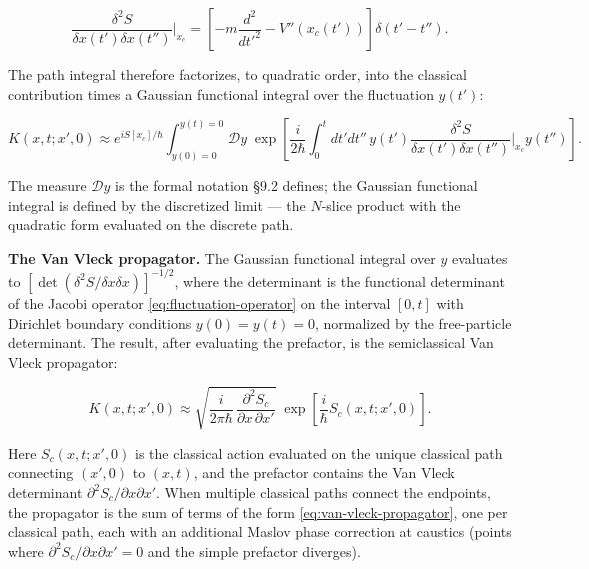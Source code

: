 \begin{linenomath}
\begin{equation}
\frac{\delta^2 S}{\delta x(t')\delta x(t'')}\bigg|_{x_c}
= \left[-m\frac{d^2}{dt'^2} - V''(x_c(t'))\right]\delta(t'-t'').
\label{eq:fluctuation-operator}
\end{equation}
\end{linenomath}
The path integral therefore factorizes, to quadratic order, into the classical contribution times a Gaussian functional integral over the fluctuation $y(t')$:
\begin{linenomath}
\begin{equation}
K(x,t;x',0) \approx e^{i S[x_c]/\hbar}
\int_{y(0)=0}^{y(t)=0} \mathcal{D}y\;
\exp\!\left[\frac{i}{2\hbar}\int_0^t dt' dt''\, y(t')\frac{\delta^2 S}{\delta x(t')\delta x(t'')}\bigg|_{x_c} y(t'')\right].
\end{equation}
\end{linenomath}
The measure $\mathcal{D}y$ is the formal notation \S9.2 defines; the Gaussian functional integral is defined by the discretized limit --- the $N$-slice product with the quadratic form evaluated on the discrete path.

\medskip\noindent\textbf{The Van Vleck propagator.}
The Gaussian functional integral over $y$ evaluates to $[\det(\delta^2 S/\delta x\delta x)]^{-1/2}$, where the determinant is the functional determinant of the Jacobi operator \eqref{eq:fluctuation-operator} on the interval $[0,t]$ with Dirichlet boundary conditions $y(0)=y(t)=0$, normalized by the free-particle determinant. The result, after evaluating the prefactor, is the semiclassical Van Vleck propagator:
\begin{linenomath}
\begin{equation}
K(x,t;x',0) \approx \sqrt{\frac{i}{2\pi\hbar}\,\frac{\partial^2 S_c}{\partial x\,\partial x'}}\;
\exp\!\left[\frac{i}{\hbar}S_c(x,t;x',0)\right].
\label{eq:van-vleck-propagator}
\end{equation}
\end{linenomath}
Here $S_c(x,t;x',0)$ is the classical action evaluated on the unique classical path connecting $(x',0)$ to $(x,t)$, and the prefactor contains the Van Vleck determinant $\partial^2 S_c/\partial x\partial x'$. When multiple classical paths connect the endpoints, the propagator is the sum of terms of the form \eqref{eq:van-vleck-propagator}, one per classical path, each with an additional Maslov phase correction at caustics (points where $\partial^2 S_c / \partial x \partial x' = 0$ and the simple prefactor diverges).

